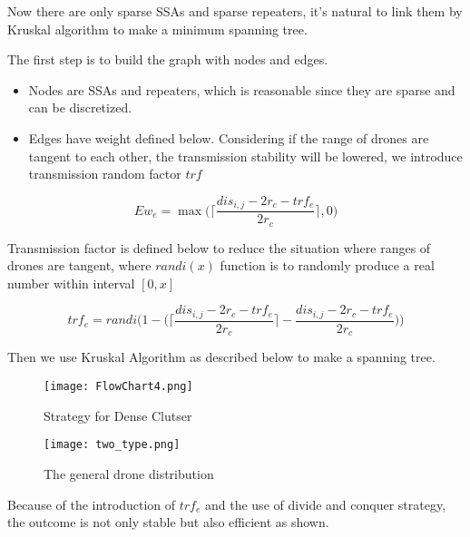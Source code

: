 \documentclass[../main]{subfiles}
\begin{document}
Now there are only sparse SSAs and sparse repeaters, it's natural to
link them by Kruskal algorithm to make a minimum spanning tree.

The first step is to build the graph with nodes and edges.

\begin{itemize}
\item
  Nodes are SSAs and repeaters, which is reasonable since they are
  sparse and can be discretized.
\item
  Edges have weight defined below. Considering if the range of drones
  are tangent to each other, the transmission stability will be lowered,
  we introduce transmission random factor \(trf\)
\end{itemize}

\begin{equation}
Ew_e= \max{ \Bigg(\Bigg\lceil \frac { dis_{i,j}  - 2r_c - trf_e} {2r_c} \Bigg\rceil,0\Bigg)}
\end{equation}

Transmission factor is defined below to reduce the situation where
ranges of drones are tangent, where \(randi(x)\) function is to randomly
produce a real number within interval \([0,x]\)

\begin{equation}
trf_e= randi \Bigg( 1- \Bigg(\Bigg\lceil \frac { dis_{i,j}  - 2r_c - trf_e} {2r_c} \Bigg\rceil -\frac { dis_{i,j}  - 2r_c - trf_e} {2r_c} \Bigg)\Bigg)
\end{equation}

Then we use Kruskal Algorithm\cite{kruskal} as described below to make a
spanning tree.

\newpage

\begin{figure}[h!]
      \centering
      \texttt{[image: FlowChart4.png]}
      \caption{Strategy for Dense Clutser}
    \end{figure}



\begin{figure}[h!]
      \centering
      \texttt{[image: two\_type.png]}
      \caption{The general drone distribution}
    \end{figure}

Because of the introduction of \(trf_e\) and the use of divide and
conquer strategy, the outcome is not only stable but also efficient as
shown.
\end{document}
